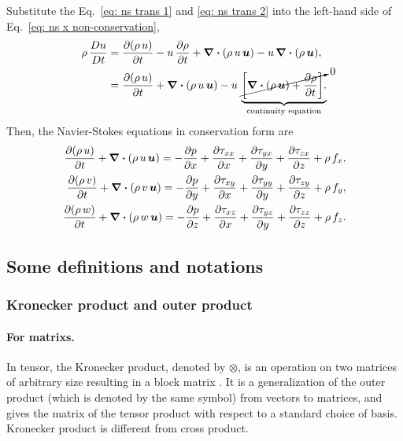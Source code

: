 Substitute the Eq.~\eqref{eq: ns trans 1} and \eqref{eq: ns trans 2} into the left-hand side of Eq.~\eqref{eq: ns x non-conservation}, 
\begin{equation}
\begin{aligned}
    \rho\,\frac{Du}{Dt} 
    &= \pdv{(\rho\,u)}{t}
    - u\, \pdv{\rho}{t} 
    + \div (\rho\,u \,\bm{u})
    - u\, \div (\rho\, \bm{u}), \\
    &= \pdv{(\rho\,u)}{t}
    + \div (\rho\,u \,\bm{u}) 
    -u\,
    \underbrace{\cancelto{0}{\left[
        \div (\rho\, \bm{u}) + \pdv{\rho}{t}
    \right]}.}_\text{continuity equation}
\end{aligned}
\end{equation}
Then, the Navier-Stokes equations in conservation form are 
\begin{subequations}
\begin{align}
    \pdv{(\rho\,u)}{t}
    + \div (\rho\,u \,\bm{u}) 
    = -\frac{\partial p}{\partial x}
    +\frac{\partial \tau_{xx}}{\partial x}
    +\frac{\partial \tau_{yx}}{\partial y}
    +\frac{\partial \tau_{zx}}{\partial z}
    + \rho\, f_x, 
    \label{eq: ns x conservation} \\
    \pdv{(\rho\,v)}{t}
    + \div (\rho\,v \,\bm{u})
    = -\frac{\partial p}{\partial y}
    +\frac{\partial \tau_{xy}}{\partial x}
    +\frac{\partial \tau_{yy}}{\partial y}
    +\frac{\partial \tau_{zy}}{\partial z}
    + \rho\, f_y, 
    \label{eq: ns y conservation} \\
    \pdv{(\rho\,w)}{t}
    + \div (\rho\,w \,\bm{u})
    = -\frac{\partial p}{\partial z}
    +\frac{\partial \tau_{xz}}{\partial x}
    +\frac{\partial \tau_{yz}}{\partial y}
    +\frac{\partial \tau_{zz}}{\partial z}
    + \rho\, f_z. 
    \label{eq: ns z conservation} 
\end{align}
\label{eq: ns conservation}
\end{subequations}

\subsection{Some definitions and notations}
\subsubsection{Kronecker product and outer product}
\paragraph{For matrixs. }
In tensor, the Kronecker product, denoted by $\otimes$, is an operation on two matrices of arbitrary size resulting in a block matrix \citep{wiki:Kronecker}. 
It is a generalization of the outer product (which is denoted by the same symbol) from vectors to matrices, and gives the matrix of the tensor product with respect to a standard choice of basis. 
Kronecker product is different from cross product. 

